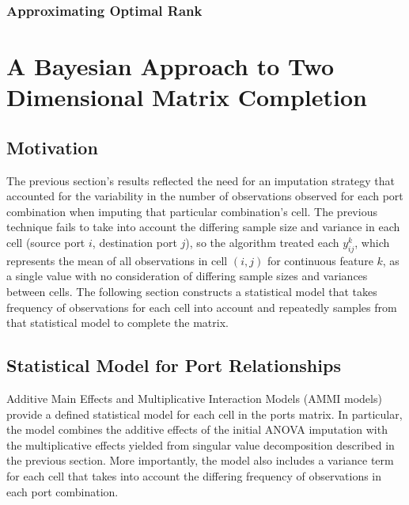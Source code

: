 \documentclass[12pt,twoside]{dukestatscithesis}
\theoremstyle{definition}
\theoremstyle{definition}
\theoremstyle{definition}
\theoremstyle{remark}
\begin{document}
\subsection{Approximating Optimal
Rank}\label{approximating-optimal-rank}

\chapter{A Bayesian Approach to Two Dimensional Matrix
Completion}\label{a-bayesian-approach-to-two-dimensional-matrix-completion}

\section{Motivation}\label{motivation-2}

The previous section's results reflected the need for an imputation
strategy that accounted for the variability in the number of
observations observed for each port combination when imputing that
particular combination's cell. The previous technique fails to take into
account the differing sample size and variance in each cell (source port
\(i\), destination port \(j\)), so the algorithm treated each
\(y_{ij}^{k}\), which represents the mean of all observations in cell
\((i,j)\) for continuous feature \(k\), as a single value with no
consideration of differing sample sizes and variances between cells. The
following section constructs a statistical model that takes frequency of
observations for each cell into account and repeatedly samples from that
statistical model to complete the matrix.

\section{Statistical Model for Port
Relationships}\label{statistical-model-for-port-relationships}

Additive Main Effects and Multiplicative Interaction Models (AMMI
models) provide a defined statistical model for each cell in the ports
matrix. In particular, the model combines the additive effects of the
initial ANOVA imputation with the multiplicative effects yielded from
singular value decomposition described in the previous section. More
importantly, the model also includes a variance term for each cell that
takes into account the differing frequency of observations in each port
combination.
\end{document}
